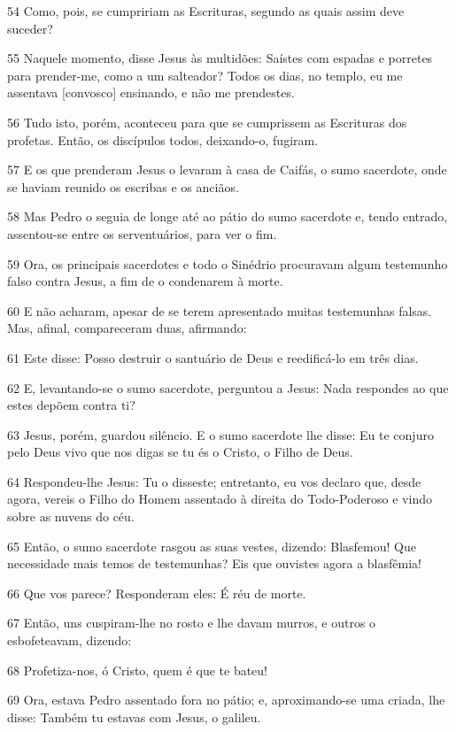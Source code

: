 \par 54 Como, pois, se cumpririam as Escrituras, segundo as quais assim deve suceder?
\par 55 Naquele momento, disse Jesus às multidões: Saístes com espadas e porretes para prender-me, como a um salteador? Todos os dias, no templo, eu me assentava [convosco] ensinando, e não me prendestes.
\par 56 Tudo isto, porém, aconteceu para que se cumprissem as Escrituras dos profetas. Então, os discípulos todos, deixando-o, fugiram.
\par 57 E os que prenderam Jesus o levaram à casa de Caifás, o sumo sacerdote, onde se haviam reunido os escribas e os anciãos.
\par 58 Mas Pedro o seguia de longe até ao pátio do sumo sacerdote e, tendo entrado, assentou-se entre os serventuários, para ver o fim.
\par 59 Ora, os principais sacerdotes e todo o Sinédrio procuravam algum testemunho falso contra Jesus, a fim de o condenarem à morte.
\par 60 E não acharam, apesar de se terem apresentado muitas testemunhas falsas. Mas, afinal, compareceram duas, afirmando:
\par 61 Este disse: Posso destruir o santuário de Deus e reedificá-lo em três dias.
\par 62 E, levantando-se o sumo sacerdote, perguntou a Jesus: Nada respondes ao que estes depõem contra ti?
\par 63 Jesus, porém, guardou silêncio. E o sumo sacerdote lhe disse: Eu te conjuro pelo Deus vivo que nos digas se tu és o Cristo, o Filho de Deus.
\par 64 Respondeu-lhe Jesus: Tu o disseste; entretanto, eu vos declaro que, desde agora, vereis o Filho do Homem assentado à direita do Todo-Poderoso e vindo sobre as nuvens do céu.
\par 65 Então, o sumo sacerdote rasgou as suas vestes, dizendo: Blasfemou! Que necessidade mais temos de testemunhas? Eis que ouvistes agora a blasfêmia!
\par 66 Que vos parece? Responderam eles: É réu de morte.
\par 67 Então, uns cuspiram-lhe no rosto e lhe davam murros, e outros o esbofeteavam, dizendo:
\par 68 Profetiza-nos, ó Cristo, quem é que te bateu!
\par 69 Ora, estava Pedro assentado fora no pátio; e, aproximando-se uma criada, lhe disse: Também tu estavas com Jesus, o galileu.
